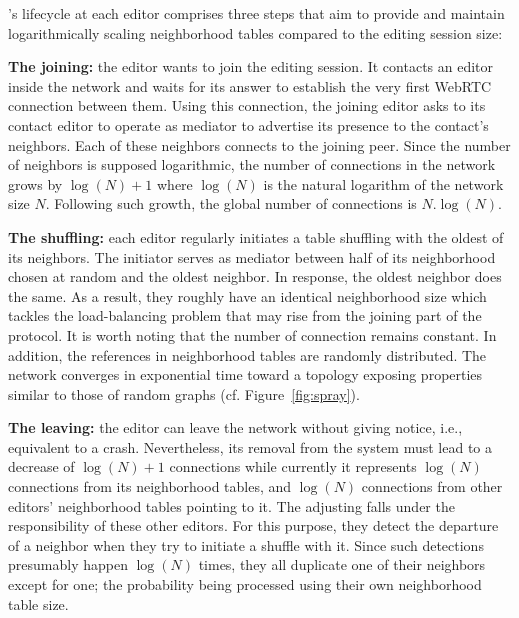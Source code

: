 \SPRAY's lifecycle at each editor comprises three steps that aim to provide and
maintain logarithmically scaling neighborhood tables compared to the editing
session size:
\begin{asparadesc}
\item [\textbf{The joining:}] the editor wants to join the editing session. It
  contacts an editor inside the network and waits for its answer to establish
  the very first WebRTC connection between them. Using this connection, the
  joining editor asks to its contact editor to operate as mediator to advertise
  its presence to the contact's neighbors. Each of these neighbors connects to
  the joining peer. Since the number of neighbors is supposed logarithmic, the
  number of connections in the network grows by $\log(N)+1$ where $\log(N)$ is
  the natural logarithm of the network size $N$. Following such growth, the
  global number of connections is $N.\log(N)$.
\item [\textbf{The shuffling:}] each editor regularly initiates a table
  shuffling with the oldest of its neighbors. The initiator serves as mediator
  between half of its neighborhood chosen at random and the oldest neighbor. In
  response, the oldest neighbor does the same. As a result, they roughly have an
  identical neighborhood size which tackles the load-balancing problem that may
  rise from the joining part of the protocol. It is worth noting that the number
  of connection remains constant. In addition, the references in neighborhood
  tables are randomly distributed. The network converges in exponential time
  toward a topology exposing properties similar to those of random
  graphs (cf. Figure~\ref{fig:spray}).
\item [\textbf{The leaving:}] the editor can leave the network without giving
  notice, i.e., equivalent to a crash. Nevertheless, its removal from the system
  must lead to a decrease of $\log(N)+1$ connections while currently it
  represents $\log(N)$ connections from its neighborhood tables, and $\log(N)$
  connections from other editors' neighborhood tables pointing to it. The
  adjusting falls under the responsibility of these other editors. For this
  purpose, they detect the departure of a neighbor when they try to initiate a
  shuffle with it. Since such detections presumably happen $\log(N)$ times, they
  all duplicate one of their neighbors except for one; the probability being
  processed using their own neighborhood table size.
\end{asparadesc}

